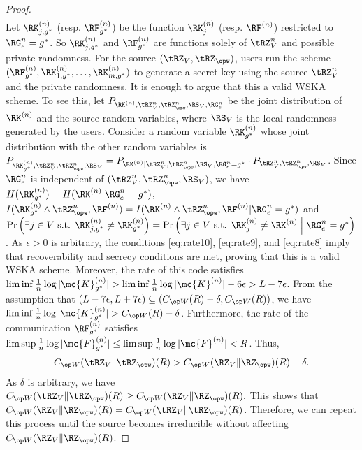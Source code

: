 \begin{proof}
\begin{subequations}
\begin{gather}
\end{gather}
\end{subequations}
Let $\RK^{(n)}_{j, g^*}$ (resp. $\RF^{(n)}_{g^*}$) be the function  $\RK^{(n)}_j$ (resp. $\RF^{(n)}$) restricted to $\RG^n_e={g^*}$. So $\RK^{(n)}_{j, g^*}$ and $\RF^{(n)}_{g^*}$ are  functions solely of $\tRZ_V^n$ and possible private randomness. For the source $(\tRZ_V, \tRZ_{\opw})$, users run the scheme $(\RF^{(n)}_{g^*},\RK^{(n)}_{1, g^*}, \ldots, \RK^{(n)}_{m, g^*})$ to generate a secret key using the source $\tRZ_V^n$ and the private randomness. It is enough to argue that this a valid WSKA scheme. To see this, let $P_{\RK^{(n)},\tRZ_V^n, \tRZ_{\opw}^n,\RS_V,\RG^n_e}$ be the joint distribution of $\RK^{(n)}$ and the source random variables, where $\RS_V$ is the local randomness generated by the users. Consider a random variable $\RK^{(n)}_{g^*}$ whose joint distribution with the other random variables is $P_{\RK^{(n)}_{g^*},\tRZ_V^n, \tRZ_{\opw}^n,\RS_V}=P_{\RK^{(n)}|\tRZ_V^n, \tRZ_{\opw}^n,\RS_V,\RG^n_e=g^*}\cdot P_{\tRZ_V^n, \tRZ_{\opw}^n,\RS_V}$. Since $\RG^n_e$ is independent of $(\tRZ_V^n, \tRZ_{\opw}^n,\RS_V)$, we have $H(\RK^{(n)}_{g^*})=H(\RK^{(n)}|\RG^n_e={g^*})$, $I(\RK^{(n)}_{g^*}\wedge\tRZ^n_{\opw},\RF^{(n)})=I(\RK^{(n)}\wedge\tRZ^n_{\opw},\RF^{(n)}|\RG^n_e={g^*})$ and $\Pr\left( \exists j\in V \text{ s.t. } \RK_{j, g^*}^{(n)}\neq \RK_{g^*}^{(n)}\right)=\Pr\left( \exists j\in V \text{ s.t. } \RK_j^{(n)}\neq \RK^{(n)}\Bigm\vert \RG^n_e=g^*\right)$. As $\epsilon>0$ is arbitrary, the conditions \eqref{eq:rate10}, \eqref{eq:rate9}, and \eqref{eq:rate8} imply that recoverability and secrecy conditions are met, proving that this is a valid WSKA scheme. Moreover, the rate of this code satisfies
$\liminf \frac{1}{n} \log|\mc{K}^{(n)}_{g^*}|> \liminf \frac{1}{n} \log|\mc{K}^{(n)}|-6 \epsilon > L-7\epsilon$. From the assumption that $(L-7\epsilon, L+7\epsilon) \subseteq (\wskc(R)-\delta, \wskc(R))$, we have $\liminf \frac{1}{n} \log|\mc{K}^{(n)}_{g^*}|>\wskc(R)-\delta$. Furthermore, the rate of the communication $\RF^{(n)}_{g^*}$ satisfies $\limsup\frac{1}{n}\log|\mc{F}^{(n)}_{g^*}|\leq \limsup\frac{1}{n}\log|\mc{F}^{(n)}| < R$.
Thus,
\begin{align*}
    \wskc(\tRZ_V\|\tRZ_{\opw})(R)>\wskc(\RZ_V\| \RZ_{\opw})(R)-\delta.
\end{align*}
As $\delta$ is arbitrary, we have $\wskc(\tRZ_V\|\tRZ_{\opw})(R)
\geq \wskc(\RZ_V\| \RZ_{\opw})(R).$
This shows that  $\wskc(\RZ_V\| \RZ_{\opw})(R)= \wskc(\tRZ_V\|\tRZ_{\opw})(R)$. Therefore, we can repeat this process until the source becomes irreducible without affecting $\wskc(\RZ_V\| \RZ_{\opw})(R)$.
\end{proof}

